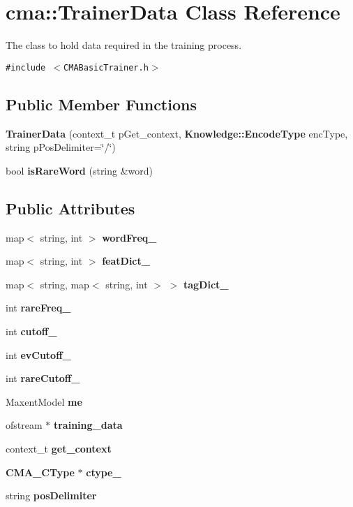 \section{cma::TrainerData Class Reference}
\label{classcma_1_1TrainerData}
The class to hold data required in the training process.  


{\tt \#include $<$CMABasicTrainer.h$>$}

\subsection*{Public Member Functions}
\begin{CompactItemize}
\item 
\textbf{TrainerData} (context\_\-t pGet\_\-context, {\bf Knowledge::EncodeType} encType, string pPosDelimiter=\char`\"{}/\char`\"{})\label{classcma_1_1TrainerData_52479f4d8dfb9764cc59b226c06658da}

\item 
bool \textbf{isRareWord} (string \&word)\label{classcma_1_1TrainerData_309417a7099ac688be954c81a9c98742}

\end{CompactItemize}
\subsection*{Public Attributes}
\begin{CompactItemize}
\item 
map$<$ string, int $>$ {\bf wordFreq\_\-}
\item 
map$<$ string, int $>$ {\bf featDict\_\-}
\item 
map$<$ string, map$<$ string, int $>$ $>$ {\bf tagDict\_\-}
\item 
int {\bf rareFreq\_\-}
\item 
int {\bf cutoff\_\-}
\item 
int {\bf evCutoff\_\-}
\item 
int \textbf{rareCutoff\_\-}\label{classcma_1_1TrainerData_29cc800fcc110731293ef351c7a7bfdf}

\item 
MaxentModel {\bf me}
\item 
ofstream $\ast$ {\bf training\_\-data}
\item 
context\_\-t {\bf get\_\-context}
\item 
{\bf CMA\_\-CType} $\ast$ {\bf ctype\_\-}
\item 
string {\bf posDelimiter}
\end{CompactItemize}


